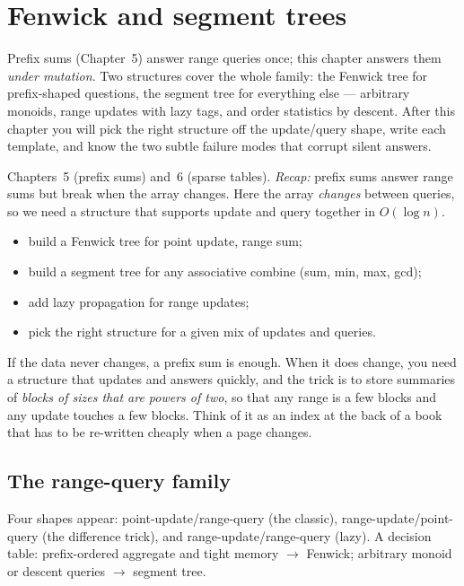 \chapter{Fenwick and segment trees}\label{ch:fenseg}

Prefix sums (Chapter~5) answer range queries once; this chapter
answers them \emph{under mutation}. Two structures cover the whole
family: the Fenwick tree for prefix-shaped questions, the segment
tree for everything else --- arbitrary monoids, range updates with
lazy tags, and order statistics by descent. After this chapter you
will pick the right structure off the update/query shape, write
each template, and know the two subtle failure modes that corrupt
silent answers.

\begin{rulebox}
Chapters~5 (prefix sums) and~6 (sparse tables). \emph{Recap:} prefix sums answer range sums but break when the array changes. Here the array \emph{changes} between queries, so we need a structure that supports update and query together in $O(\log n)$.
\end{rulebox}
\begin{wins}
\begin{itemize}
\item build a Fenwick tree for point update, range sum;
\item build a segment tree for any associative combine (sum, min, max, gcd);
\item add lazy propagation for range updates;
\item pick the right structure for a given mix of updates and queries.
\end{itemize}
\end{wins}
\begin{principle}
If the data never changes, a prefix sum is enough. When it does change, you need a structure that updates and answers quickly, and the trick is to store summaries of \emph{blocks of sizes that are powers of two}, so that any range is a few blocks and any update touches a few blocks. Think of it as an index at the back of a book that has to be re-written cheaply when a page changes.
\end{principle}

\section{The range-query family}\label{sec:family}
Four shapes appear: point-update/range-query (the classic),
range-update/point-query (the difference trick), and
range-update/range-query (lazy). A decision table: prefix-ordered
aggregate and tight memory $\to$ Fenwick; arbitrary monoid or
descent queries $\to$ segment tree.


